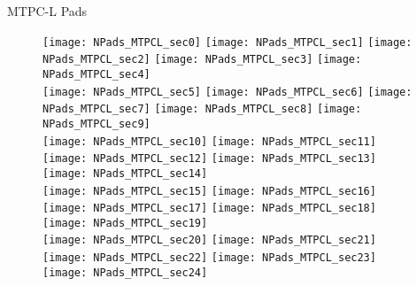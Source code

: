 \documentclass[11pt]{beamer}
\begin{document}
\begin{frame}{MTPC-L Pads}
\begin{figure}
\texttt{[image: NPads\_MTPCL\_sec0]}
\texttt{[image: NPads\_MTPCL\_sec1]}
\texttt{[image: NPads\_MTPCL\_sec2]}
\texttt{[image: NPads\_MTPCL\_sec3]}
\texttt{[image: NPads\_MTPCL\_sec4]}\\
\texttt{[image: NPads\_MTPCL\_sec5]}
\texttt{[image: NPads\_MTPCL\_sec6]}
\texttt{[image: NPads\_MTPCL\_sec7]}
\texttt{[image: NPads\_MTPCL\_sec8]}
\texttt{[image: NPads\_MTPCL\_sec9]}\\
\texttt{[image: NPads\_MTPCL\_sec10]}
\texttt{[image: NPads\_MTPCL\_sec11]}
\texttt{[image: NPads\_MTPCL\_sec12]}
\texttt{[image: NPads\_MTPCL\_sec13]}
\texttt{[image: NPads\_MTPCL\_sec14]}\\
\texttt{[image: NPads\_MTPCL\_sec15]}
\texttt{[image: NPads\_MTPCL\_sec16]}
\texttt{[image: NPads\_MTPCL\_sec17]}
\texttt{[image: NPads\_MTPCL\_sec18]}
\texttt{[image: NPads\_MTPCL\_sec19]}\\
\texttt{[image: NPads\_MTPCL\_sec20]}
\texttt{[image: NPads\_MTPCL\_sec21]}
\texttt{[image: NPads\_MTPCL\_sec22]}
\texttt{[image: NPads\_MTPCL\_sec23]}
\texttt{[image: NPads\_MTPCL\_sec24]}

\end{figure}
\end{frame}
\end{document}
